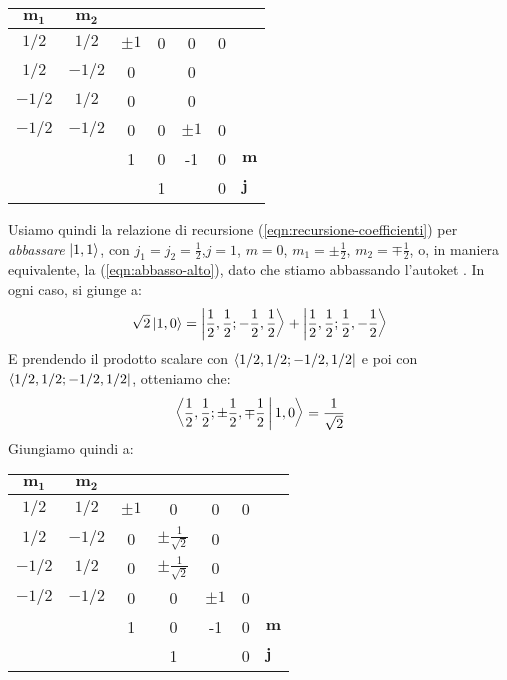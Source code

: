 \documentclass[../../FisicaTeorica.tex]{subfiles}
\begin{document}
\begin{table}[H]
\centering
\begin{tabular}{@{}cccccc|l@{}}
\toprule
$\bm{m_1}$ & \multicolumn{1}{c|}{$\bm{m_2}$} &  &  &  &  &  \\ \midrule
$1/2$ & \multicolumn{1}{c|}{$1/2$} & $\pm 1$ & 0 & 0 & 0 &  \\
$1/2$ & \multicolumn{1}{c|}{$-1/2$} & 0  &  & 0 &  &  \\
$-1/2$ & \multicolumn{1}{c|}{$1/2$} & 0 &  & 0 &  &  \\
$-1/2$ & \multicolumn{1}{c|}{$-1/2$} & 0 & 0 & $\pm1$ & 0 &  \\ \midrule
 &  & 1 & 0 & -1 & 0 & $\bm{m}$ \\
 &  & \multicolumn{3}{c}{1} & 0 & $\bm{j}$ \\ \bottomrule
\end{tabular}
\label{tab:clebsh-gordon-22}
\end{table}
Usiamo quindi la relazione di recursione (\ref{eqn:recursione-coefficienti}) per \textit{abbassare} $\Ket{1,1}$, con $j_1=j_2=\frac{1}{2}$,$j=1$, $m=0$, $m_1=\pm \frac{1}{2}$, $m_2=\mp\frac{1}{2}$, o, in maniera equivalente, la (\ref{eqn:abbasso-alto}), dato che stiamo abbassando l'autoket . In ogni caso, si giunge a:
\begin{align*}
\sqrt{2}\Ket{1,0} =\Ket{\frac{1}{2},\frac{1}{2};-\frac{1}{2},\frac{1}{2}} + \Ket{\frac{1}{2},\frac{1}{2};\frac{1}{2},-\frac{1}{2}}
\end{align*}
E prendendo il prodotto scalare con $\Bra{1/2, 1/2; -1/2, 1/2}$ e poi con $\Bra{1/2, 1/2; -1/2, 1/2}$, otteniamo che:
\begin{align*}
\Braket{\frac{1}{2},\frac{1}{2};\pm \frac{1}{2}, \mp\frac{1}{2}|1,0} = \frac{1}{\sqrt{2}}
\end{align*}
Giungiamo quindi a:
\begin{table}[H]
\centering
\begin{tabular}{@{}cccccc|l@{}}
\toprule
$\bm{m_1}$ & \multicolumn{1}{c|}{$\bm{m_2}$} &  &  &  &  &  \\ \midrule
$1/2$ & \multicolumn{1}{c|}{$1/2$} & $\pm 1$ & 0 & 0 & 0 &  \\
$1/2$ & \multicolumn{1}{c|}{$-1/2$} & 0  & $\pm\frac{1}{\sqrt{2}}$ & 0 &  &  \\
$-1/2$ & \multicolumn{1}{c|}{$1/2$} & 0 & $\pm\frac{1}{\sqrt{2}}$ & 0 &  &  \\
$-1/2$ & \multicolumn{1}{c|}{$-1/2$} & 0 & 0 & $\pm1$ & 0 &  \\ \midrule
 &  & 1 & 0 & -1 & 0 & $\bm{m}$ \\
 &  & \multicolumn{3}{c}{1} & 0 & $\bm{j}$ \\ \bottomrule
\end{tabular}
\label{tab:clebsh-gordon-3}
\end{table}
\end{document}
